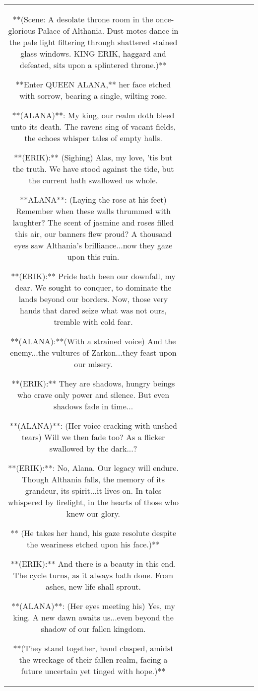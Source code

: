 \begin{table}[h!]
\begin{tabular}{|c|c|c|c|c|c|c|c|c|c|}
**(Scene: A desolate throne room in the once-glorious Palace of Althania. Dust motes dance in the pale light filtering through shattered stained glass windows. KING ERIK, haggard and defeated, sits upon a splintered throne.)**

**Enter QUEEN ALANA,** her face etched with sorrow, bearing a single, wilting rose.

**(ALANA)**: My king, our realm doth bleed unto its death. The ravens sing of vacant fields, the echoes whisper tales of empty halls. 


**(ERIK):** (Sighing) Alas, my love, 'tis but the truth. We have stood against the tide, but the current hath swallowed us whole.

**ALANA**:  (Laying the rose at his feet) Remember when these walls thrummed with laughter? The scent of jasmine and roses filled this air, our banners flew proud? A thousand eyes saw Althania's brilliance...now they gaze upon this ruin.


**(ERIK):** Pride hath been our downfall, my dear. We sought to conquer, to dominate the lands beyond our borders. Now, those very hands that dared seize what was not ours, tremble with cold fear.

**(ALANA):**(With a strained voice) And the enemy...the vultures of Zarkon...they feast upon our misery.  

**(ERIK):** They are shadows, hungry beings who crave only power and silence. But even shadows fade in time...


**(ALANA)**: (Her voice cracking with unshed tears) Will we then fade too? As a flicker swallowed by the dark...? 



**(ERIK):**: No, Alana. Our legacy will endure. Though Althania falls, the memory of its grandeur, its spirit...it lives on. In tales whispered by firelight, in the hearts of those who knew our glory.


  

** (He takes her hand, his gaze resolute despite the weariness etched upon his face.)** 



**(ERIK):** And there is a beauty in this end. The cycle turns, as it always hath done. From ashes, new life shall sprout.


**(ALANA)**: (Her eyes meeting his) Yes, my king. A new dawn awaits us...even beyond the shadow of our fallen kingdom.

 **(They stand together, hand clasped, amidst the wreckage of their fallen realm, facing a future uncertain yet tinged with hope.)**




\end{tabular}
\end{table}
